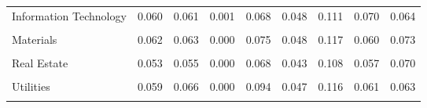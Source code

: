 \begin{table}[H]
{\begin{tabular}{lcccccccc}
Information Technology & 0.060 & 0.061 & 0.001 & 0.068 & 0.048 & 0.111 & 0.070 & 0.064 \\\\
Materials & 0.062 & 0.063 & 0.000 & 0.075 & 0.048 & 0.117 & 0.060 & 0.073 \\\\
Real Estate & 0.053 & 0.055 & 0.000 & 0.068 & 0.043 & 0.108 & 0.057 & 0.070 \\\\
Utilities & 0.059 & 0.066 & 0.000 & 0.094 & 0.047 & 0.116 & 0.061 & 0.063 \\\\
            \bottomrule
            \end{tabular}%
            }
            \end{table}